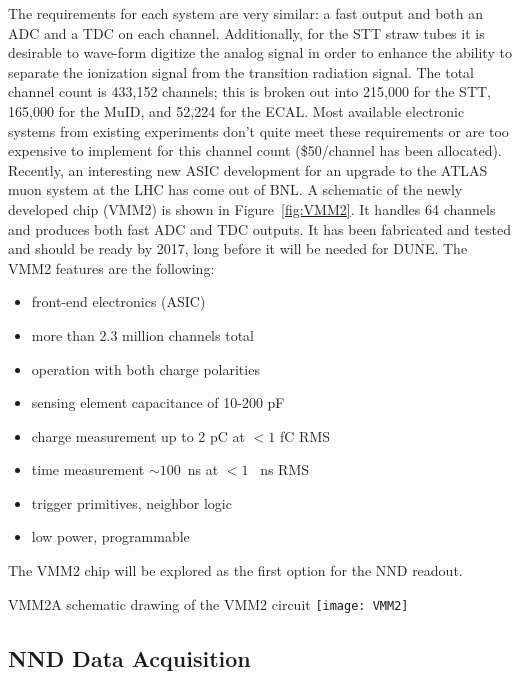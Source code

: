 The requirements for each system are very similar: a fast output and both an ADC %
and a TDC on each channel.  %
Additionally, for the STT straw tubes it 
is desirable to wave-form digitize the analog signal in order to enhance the ability to separate 
the ionization signal from the transition radiation signal.  
The total channel count is 433,152 channels; this is broken out into 215,000 for the  STT, 165,000 for the
 MuID, and 52,224 for the ECAL. Most available electronic systems from 
existing experiments don't quite meet these requirements or are too expensive to implement 
for this channel count (\$50/channel has been allocated).  Recently, %
an interesting new ASIC development for an upgrade to the ATLAS muon system at the LHC %
has come out of BNL.  
 A schematic of the newly developed chip (VMM2) is shown in 
Figure~\ref{fig:VMM2}.  It handles 64 channels and produces both fast ADC and TDC outputs.
It has been fabricated and tested and should be ready by 2017, long before it will be needed for DUNE. %
The VMM2 features are the following:
\begin{itemize}
\item front-end electronics (ASIC)
\item more than 2.3 million channels total
\item operation with both charge polarities
\item sensing element capacitance of 10-200 pF
\item charge measurement up to 2 pC at $< 1$ fC RMS
\item time measurement $\sim100$~ns at $< 1$ ~ns RMS
\item trigger primitives, neighbor logic
\item low power, programmable
\end{itemize}
The VMM2 chip will be explored  as the first option for the NND readout.  


\begin{cdrfigure}{VMM2}{A schematic drawing of the VMM2 circuit}
\texttt{[image: VMM2]}
\end{cdrfigure}


\subsection{NND Data Acquisition} %
\label{sec:nd:nnd:daq}

